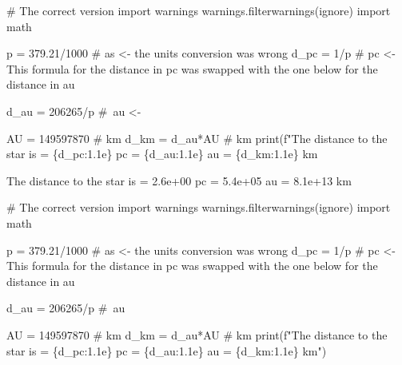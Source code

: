 \documentclass[
  letterpaper,
  DIV=11,
  numbers=noendperiod]{scrartcl}
\newenvironment{Shaded}{\begin{snugshade}}{\end{snugshade}}
\newcommand{\BuiltInTok}[1]{\textcolor[rgb]{0.00,0.23,0.31}{#1}}
\newcommand{\CommentTok}[1]{\textcolor[rgb]{0.37,0.37,0.37}{#1}}
\newcommand{\DecValTok}[1]{\textcolor[rgb]{0.68,0.00,0.00}{#1}}
\newcommand{\FloatTok}[1]{\textcolor[rgb]{0.68,0.00,0.00}{#1}}
\newcommand{\ImportTok}[1]{\textcolor[rgb]{0.00,0.46,0.62}{#1}}
\newcommand{\NormalTok}[1]{\textcolor[rgb]{0.00,0.23,0.31}{#1}}
\newcommand{\OperatorTok}[1]{\textcolor[rgb]{0.37,0.37,0.37}{#1}}
\newcommand{\SpecialCharTok}[1]{\textcolor[rgb]{0.37,0.37,0.37}{#1}}
\newcommand{\SpecialStringTok}[1]{\textcolor[rgb]{0.13,0.47,0.30}{#1}}
\newcommand{\StringTok}[1]{\textcolor[rgb]{0.13,0.47,0.30}{#1}}
\begin{document}
\begin{Shaded}
\begin{Highlighting}[]
\CommentTok{\# The correct version}
\ImportTok{import}\NormalTok{ warnings}
\NormalTok{warnings.filterwarnings(}\StringTok{\textquotesingle{}ignore\textquotesingle{}}\NormalTok{)}
\ImportTok{import}\NormalTok{ math}

\NormalTok{p }\OperatorTok{=} \FloatTok{379.21}\OperatorTok{/}\DecValTok{1000} \CommentTok{\# as \textless{}{-} the units conversion was wrong}
\NormalTok{d\_pc }\OperatorTok{=} \DecValTok{1}\OperatorTok{/}\NormalTok{p }\CommentTok{\# pc \textless{}{-} This formula for the distance in pc was swapped with the one below for the distance in au}

\NormalTok{d\_au }\OperatorTok{=} \DecValTok{206265}\OperatorTok{/}\NormalTok{p }\CommentTok{\# au \textless{}{-}}

\NormalTok{AU }\OperatorTok{=} \DecValTok{149597870} \CommentTok{\# km}
\NormalTok{d\_km }\OperatorTok{=}\NormalTok{ d\_au}\OperatorTok{*}\NormalTok{AU }\CommentTok{\# km}
\BuiltInTok{print}\NormalTok{(}\SpecialStringTok{f"The distance to the star is = }\SpecialCharTok{\{}\NormalTok{d\_pc}\SpecialCharTok{:1.1e\}}\SpecialStringTok{ pc = }\SpecialCharTok{\{}\NormalTok{d\_au}\SpecialCharTok{:1.1e\}}\SpecialStringTok{ au = }\SpecialCharTok{\{}\NormalTok{d\_km}\SpecialCharTok{:1.1e\}}\SpecialStringTok{ km}
\end{Highlighting}
\end{Shaded}

The distance to the star is = 2.6e+00 pc = 5.4e+05 au = 8.1e+13 km

\begin{Shaded}
\begin{Highlighting}[]
\CommentTok{\# The correct version}
\ImportTok{import}\NormalTok{ warnings}
\NormalTok{warnings.filterwarnings(}\StringTok{\textquotesingle{}ignore\textquotesingle{}}\NormalTok{)}
\ImportTok{import}\NormalTok{ math}

\NormalTok{p }\OperatorTok{=} \FloatTok{379.21}\OperatorTok{/}\DecValTok{1000} \CommentTok{\# as \textless{}{-} the units conversion was wrong}
\NormalTok{d\_pc }\OperatorTok{=} \DecValTok{1}\OperatorTok{/}\NormalTok{p }\CommentTok{\# pc \textless{}{-} This formula for the distance in pc was swapped with the one below for the distance in au}

\NormalTok{d\_au }\OperatorTok{=} \DecValTok{206265}\OperatorTok{/}\NormalTok{p }\CommentTok{\# au}

\NormalTok{AU }\OperatorTok{=} \DecValTok{149597870} \CommentTok{\# km}
\NormalTok{d\_km }\OperatorTok{=}\NormalTok{ d\_au}\OperatorTok{*}\NormalTok{AU }\CommentTok{\# km}
\BuiltInTok{print}\NormalTok{(}\SpecialStringTok{f"The distance to the star is = }\SpecialCharTok{\{}\NormalTok{d\_pc}\SpecialCharTok{:1.1e\}}\SpecialStringTok{ pc = }\SpecialCharTok{\{}\NormalTok{d\_au}\SpecialCharTok{:1.1e\}}\SpecialStringTok{ au = }\SpecialCharTok{\{}\NormalTok{d\_km}\SpecialCharTok{:1.1e\}}\SpecialStringTok{ km"}\NormalTok{)}
\end{Highlighting}
\end{Shaded}
\end{document}
